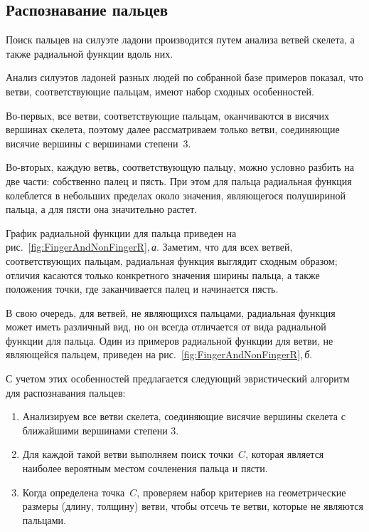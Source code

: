 \begin{multicols}{2}
\subsection{Распознавание пальцев}\label{sec:GestureRecognition_FingerDetection}

Поиск пальцев на силуэте ладони производится путем анализа ветвей скелета,
 а также радиальной функции вдоль них.

Анализ силуэтов ладоней разных людей по собранной базе примеров 
показал, что ветви, соответствующие пальцам, имеют набор сходных особенностей.

Во-первых, все ветви, соответствующие пальцам, оканчиваются в висячих вершинах скелета,
поэтому далее рассматриваем только ветви, соединяющие висячие вершины с вершинами степени~3.

Во-вторых, каждую ветвь, соответствующую пальцу, можно условно разбить на две части: 
собственно палец и пясть.
При этом для пальца радиальная функция колеблется в небольших пределах около значения, 
являющегося полушириной пальца, а для пясти она значительно растет.

График радиальной функции для пальца приведен на рис.~\ref{fig:FingerAndNonFingerR},\,\textit{а}.
Заметим, что для всех ветвей, соответствующих пальцам, радиальная функция выглядит сходным 
образом; отличия касаются только конкретного значения ширины пальца, а также положения 
точки, где заканчивается палец и начинается пясть.

В свою очередь, для ветвей, не являющихся пальцами, радиальная функция 
может иметь различный вид, но он всегда отличается от вида радиальной функции для пальца.
Один из примеров радиальной функции для ветви, не являющейся пальцем, приведен на 
рис.~\ref{fig:FingerAndNonFingerR},\,\textit{б}.



С учетом этих особенностей предлагается следующий эвристический 
алгоритм для распознавания пальцев:
\begin{enumerate}[1.]
\item Анализируем все ветви скелета, соединяющие висячие вершины скелета с ближайшими вершинами степени 3.
\item Для каждой такой ветви выполняем поиск точки~$C$, которая является наиболее вероятным местом сочленения пальца и пясти.
\item Когда определена точка~$C$, проверяем набор критериев на геометрические размеры (длину, толщину) ветви, чтобы отсечь те ветви, которые не являются пальцами.
\end{enumerate}


\end{multicols}

